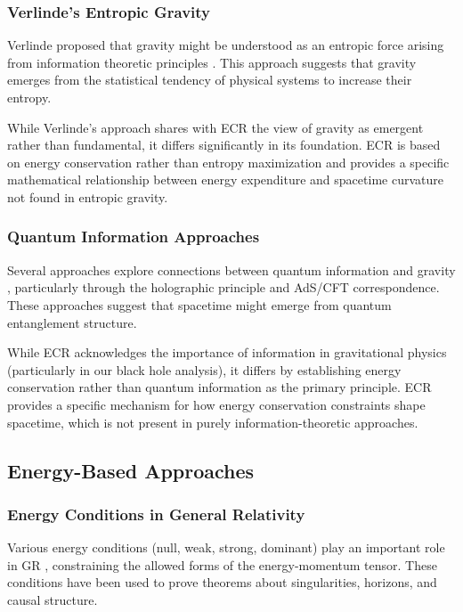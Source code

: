 \documentclass[11pt,a4paper]{article}
\begin{document}
\subsubsection{Verlinde's Entropic Gravity}

Verlinde proposed that gravity might be understood as an entropic force arising from information theoretic principles \cite{verlinde2011}. This approach suggests that gravity emerges from the statistical tendency of physical systems to increase their entropy.

While Verlinde's approach shares with ECR the view of gravity as emergent rather than fundamental, it differs significantly in its foundation. ECR is based on energy conservation rather than entropy maximization and provides a specific mathematical relationship between energy expenditure and spacetime curvature not found in entropic gravity.

\subsubsection{Quantum Information Approaches}

Several approaches explore connections between quantum information and gravity \cite{van2010, ryu2006}, particularly through the holographic principle and AdS/CFT correspondence. These approaches suggest that spacetime might emerge from quantum entanglement structure.

While ECR acknowledges the importance of information in gravitational physics (particularly in our black hole analysis), it differs by establishing energy conservation rather than quantum information as the primary principle. ECR provides a specific mechanism for how energy conservation constraints shape spacetime, which is not present in purely information-theoretic approaches.

\subsection{Energy-Based Approaches}

\subsubsection{Energy Conditions in General Relativity}

Various energy conditions (null, weak, strong, dominant) play an important role in GR \cite{hawking1973}, constraining the allowed forms of the energy-momentum tensor. These conditions have been used to prove theorems about singularities, horizons, and causal structure.
\end{document}
